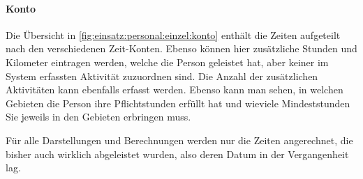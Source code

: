\paragraph{Konto}
Die Übersicht in \cref{fig:einsatz:personal:einzel:konto} enthält die Zeiten aufgeteilt nach den verschiedenen Zeit-Konten.
Ebenso können hier zusätzliche Stunden und Kilometer eintragen werden,
welche die Person geleistet hat, aber keiner im System erfassten Aktivität zuzuordnen sind.
Die Anzahl der zusätzlichen Aktivitäten kann ebenfalls erfasst werden.
Ebenso kann man sehen, in welchen Gebieten die Person ihre Pflichtstunden erfüllt hat und wieviele Mindeststunden Sie jeweils in den Gebieten erbringen muss.

\begin{hinweis}
  Für alle Darstellungen und Berechnungen werden nur die Zeiten angerechnet, die bisher auch wirklich abgeleistet wurden,
  also deren Datum in der Vergangenheit lag.
\end{hinweis}



